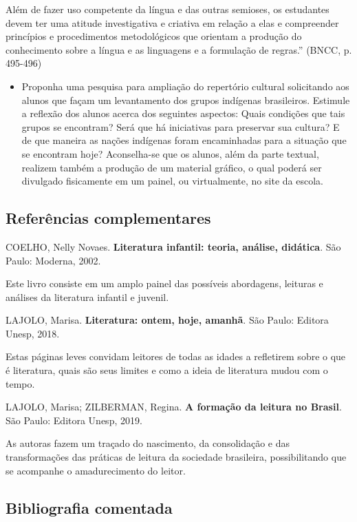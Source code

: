 \documentclass[12pt]{extarticle}
\begin{document}
Além de fazer uso competente da língua e das outras semioses, os
estudantes devem ter uma atitude investigativa e criativa em relação a
elas e compreender princípios e procedimentos metodológicos que orientam
a produção do conhecimento sobre a língua e as linguagens e a formulação
de regras.'' (BNCC, p. 495-496)

\begin{itemize}
\item
  Proponha uma pesquisa para ampliação do repertório cultural
  solicitando aos alunos que façam um levantamento dos grupos indígenas
  brasileiros. Estimule a reflexão dos alunos acerca dos seguintes
  aspectos: Quais condições que tais grupos se encontram? Será que há
  iniciativas para preservar sua cultura? E de que maneira as nações
  indígenas foram encaminhadas para a situação que se encontram hoje?
  Aconselha-se que os alunos, além da parte textual, realizem também a
  produção de um material gráfico, o qual poderá ser divulgado
  fisicamente em um painel, ou virtualmente, no site da escola.
\end{itemize}

\subsection{Referências complementares}

COELHO, Nelly Novaes. \textbf{Literatura infantil: teoria, análise,
didática}. São Paulo: Moderna, 2002.

Este livro consiste em um amplo painel das possíveis abordagens,
leituras e análises da literatura infantil e juvenil.

LAJOLO, Marisa. \textbf{Literatura: ontem, hoje, amanhã}. São Paulo:
Editora Unesp, 2018.

Estas páginas leves convidam leitores de todas as idades a refletirem
sobre o que é literatura, quais são seus limites e como a ideia de
literatura mudou com o tempo.

LAJOLO, Marisa; ZILBERMAN, Regina. \textbf{A formação da leitura no
Brasil}. São Paulo: Editora Unesp, 2019.

As autoras fazem um traçado do nascimento, da consolidação e das
transformações das práticas de leitura da sociedade brasileira,
possibilitando que se acompanhe o amadurecimento do leitor.

\subsection{Bibliografia comentada}
\end{document}
